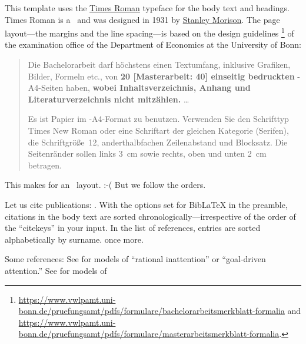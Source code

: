 This template uses the \href{https://en.wikipedia.org/wiki/Times_New_Roman}{Times Roman} typeface for the body text and headings.%
Times Roman is a~ and was designed in 1931 by \href{https://en.wikipedia.org/wiki/Stanley_Morison}{Stanley Morison}. The page layout---the margins and the line spacing---is based on the design guidelines%
\footnote{\url{https://www.vwlpamt.uni-bonn.de/pruefungsamt/pdfs/formulare/bachelorarbeitsmerkblatt-formalia} and \url{https://www.vwlpamt.uni-bonn.de/pruefungsamt/pdfs/formulare/masterarbeitsmerkblatt-formalia}.}
of the examination office of the Department of Economics at the University of Bonn:
\begin{quotation}
	Die Bachelorarbeit darf höchstens einen Textumfang, inklusive Grafiken, Bilder, Formeln etc., von \textbf{20 [Masterarbeit: 40] einseitig bedruckten} -A4-Seiten haben, \textbf{wobei Inhalts\-verzeichnis, Anhang und Literaturverzeichnis nicht mitzählen.} \dots

	Es ist Papier im -A4-Format zu benutzen. Verwenden Sie den Schrifttyp \mbox{Times} New Roman oder eine Schriftart der gleichen Kategorie (Serifen), die Schriftgröße~12, anderthalbfachen Zeilenabstand und Blocksatz. Die Seitenränder sollen links 3~cm sowie rechts, oben und unten 2~cm betragen.
\end{quotation}

This makes for an~ layout. :-( But we follow the orders. \blindtext

Let us cite  publications: \cite{Andersen2008, Andreoni2012, Balakrishnan2016, Lisi1995}.%
With the options set for BibLaTeX in the preamble, citations in the body text are  sorted chronologically---irrespective of the order of the ``citekeys'' in your input. In the list of references, entries are sorted alphabetically by surname. \cite{Andersen2008} once more.

\Blindtext[2]

Some references: See \cite{Sims2003, Gabaix2014} for models of ``rational inattention'' or ``goal-driven attention.'' See \cite{Bordalo2012, Bordalo2013, Koszegi2013, Taubinsky2014, Bushong2016} for models of 

